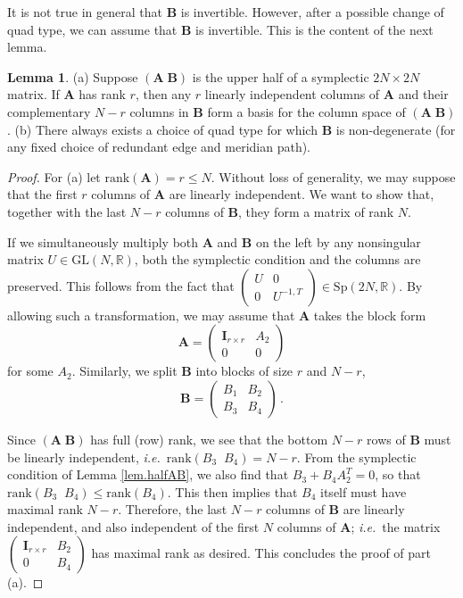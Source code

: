 \documentclass[12pt]{amsart}
\newcommand{\lbl}{\label}
\theoremstyle{definition}
\newtheorem{lemma}[theorem]{Lemma}
\def\be{  \begin{equation} }
\def\ee{  \end{equation} }
\def\Sp{\mathrm{Sp}}
\newcommand{\ie}{\emph{i.e.}}
\newcommand{\mb}{\mathbf}
\newcommand{\rank}{\mathrm{rank}}
\numberwithin{equation}{section}
\begin{document}
It is not true in general that $\mb B$ is invertible. However, after a 
possible change of quad type, we can assume that $\mb B$ is invertible. 
This is the content of the next lemma.

\begin{lemma}
\lbl{lemma.B}
\rm{(a)} Suppose $(\mb A \; \mb B)$ is the upper half of a symplectic
$2N \times 2N$ matrix. If $\mb A$ has rank $r$, then any $r$ linearly
independent columns of $\mb A$
and their complementary $N-r$ columns in $\mb B$ form a basis for the column
space of $(\mb A \; \mb B)$.
\newline
\rm{(b)}
There always exists a choice of quad type for which $\mb B$ is 
non-degenerate (for any fixed choice of redundant edge and meridian path).
\end{lemma}

\begin{proof}
For (a) let $\rank(\mb A)=r\leq N$. Without loss of generality, 
we may suppose that the first $r$ columns of $\mb A$ are linearly independent. 
We want to show that, together with the last $N-r$ columns of $\mb B$, 
they form a matrix of rank $N$.

If we simultaneously multiply both $\mb A$ and $\mb B$ on the left by 
any nonsingular matrix $U\in \mathrm{GL}(N,\mathbb R)$, both the symplectic 
condition and the columns are preserved. This follows from the fact 
that 
$\left(\begin{smallmatrix} U & 0 \\ 0 & U^{-1,T} \end{smallmatrix}\right)\in 
\Sp(2N,\mathbb R)$. By allowing such a transformation, we may 
assume that  $\mb A$ takes the block form
%
\be 
\label{Ablock} 
\mb A = \begin{pmatrix} \mb I_{r\times r} & A_2 \\ 0 & 0 \end{pmatrix} 
\ee
%
for some $A_2$. Similarly, we split $\mb B$ into blocks of size $r$ and 
$N-r$,
%
\be 
\mb B = \begin{pmatrix} B_1 & B_2 \\ B_3 & B_4 \end{pmatrix}\,. 
\ee

Since $(\mb A\;\mb B)$ has full (row) rank, we see 
that the bottom $N-r$ rows of $\mb B$ must be linearly independent, \ie\ 
$\rank(B_3\;\;B_4)=N-r$. From the symplectic condition of Lemma 
\ref{lem.halfAB}, we also find that $B_3+B_4A_2^T = 0$, so that 
$\rank (B_3\;\; B_4) \leq \rank(B_4)$. This then implies that $B_4$ 
itself must have maximal rank $N-r$. Therefore, the last $N-r$ columns 
of $\mb B$ are linearly independent, and also independent of the first 
$N$ columns of $\mb A$; \ie\ the matrix $\left(\begin{smallmatrix} 
\mb I_{r\times r} & B_2 \\ 0 & B_4 \end{smallmatrix}\right)$ has maximal 
rank as desired. This concludes the proof of part (a).


\end{proof}
\end{document}
